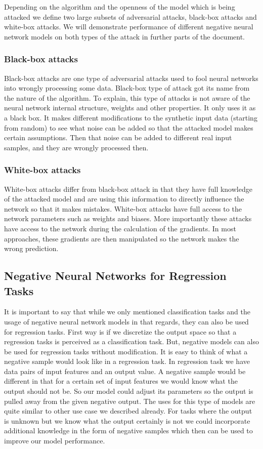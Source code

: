 \documentclass[b5paper]{book}
\begin{document}
Depending on the algorithm and the openness of the model which is being attacked we define two large subsets of adversarial attacks, black-box attacks and white-box attacks. We will demonstrate performance of different negative neural network models on both types of the attack in further parts of the document.

\subsubsection{Black-box attacks}

Black-box attacks are one type of adversarial attacks used to fool neural networks into wrongly processing some data. Black-box type of attack got its name from the nature of the algorithm. To explain, this type of attacks is not aware of the neural network internal structure, weights and other properties. It only uses it as a black box. It makes different modifications to the synthetic input data (starting from random) to see what noise can be added so that the attacked model makes certain assumptions. Then that noise can be added to different real input samples, and they are wrongly processed then. 

\subsubsection{White-box attacks}

White-box attacks differ from black-box attack in that they have full knowledge of the attacked model and are using this information to directly influence the network so that it makes mistakes. White-box attacks have full access to the network parameters such as weights and biases. More importantly these attacks have access to the network during the calculation of the gradients. In most approaches, these gradients are then manipulated so the network makes the wrong prediction.

\subsection{Negative Neural Networks for Regression Tasks}

It is important to say that while we only mentioned classification tasks and the usage of negative neural network models in that regards, they can also be used for regression tasks. First way is if we discretize the output space so that a regression tasks is perceived as a classification task. But, negative models can also be used for regression tasks without modification. It is easy to think of what a negative sample would look like in a regression task. In regression task we have data pairs of input features and an output value. A negative sample would be different in that for a certain set of input features we would know what the output should not be. So our model could adjust its parameters so the output is pulled away from the given negative output. The uses for this type of models are quite similar to other use case we described already. For tasks where the output is unknown but we know what the output certainly is not we could incorporate additional knowledge in the form of negative samples which then can be used to improve our model performance. 
\end{document}
